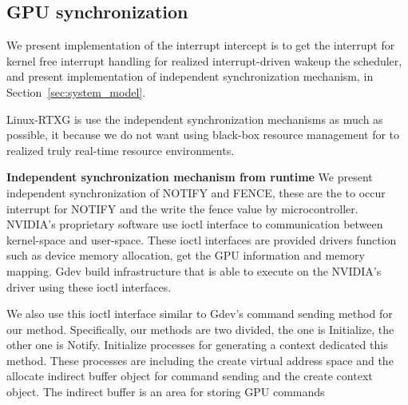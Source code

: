 \subsection{GPU synchronization}
We present implementation of the interrupt intercept is to get the interrupt for kernel free interrupt handling for realized interrupt-driven wakeup the scheduler, and present implementation of independent synchronization mechanism, in Section~\ref{sec:system_model}.

Linux-RTXG is use the independent synchronization mechanisms as much as possible,
it because we do not want using black-box resource management for to realized truly real-time resource environments.


\textbf{Independent synchronization mechanism from runtime}
We present independent synchronization of NOTIFY and FENCE, these are the to occur interrupt for NOTIFY and the write the fence value by microcontroller.
NVIDIA's proprietary software use ioctl interface to communication between kernel-space and user-space.
These ioctl interfaces are provided drivers function such as device memory allocation, get the GPU information and memory mapping.
Gdev build infrastructure that is able to execute on the NVIDIA's driver using these ioctl interfaces.

We also use this ioctl interface similar to Gdev's command sending method for our method.
Specifically, our methods are two divided, the one is Initialize, the other one is Notify.
Initialize processes for generating a context dedicated this method.
These processes are including the create virtual address space and the allocate indirect buffer object for command sending and the create context object.
The indirect buffer is an area for storing GPU commands

